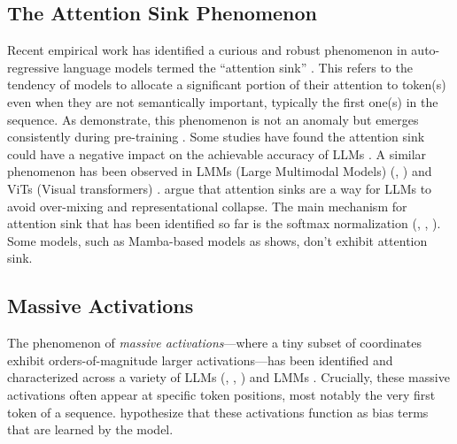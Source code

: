 \documentclass[11pt]{article}
\newif\ifYRMcomments
\newcommand{\YRM}[1]{\ifYRMcomments\textcolor{red}{[YRM: #1]}\fi}
\begin{document}
\subsection{The Attention Sink Phenomenon}
Recent empirical work has identified a curious and robust phenomenon in auto-regressive language models termed the ``attention sink'' \citep{xiao2023efficient}. This refers to the tendency of models to allocate a significant portion of their attention to token(s) even when they are not semantically important, typically the first one(s) in the sequence. As \citet{gu2025when} demonstrate, this phenomenon is not an anomaly but emerges consistently during pre-training \YRM{This is possibly the most important part of the RW. This should be with much more details and more citations, so saying specially that he demonstrated this in model without query bias and absolute positional encoding}. Some studies have found the attention sink could have a negative impact on the achievable accuracy of LLMs \cite{Yu2024Unveiling} \YRM{Can you add a bit of details here? Citing a lot of papers that write about negative impact, even if they only say so in a sentence, would be great}. A similar phenomenon has been observed in LMMs (Large Multimodal Models) (\citet{Kang2025See}, \cite{wang2025mirage}) and ViTs (Visual transformers) \cite{Feng2025EDIT:}. \citet {Barbero2025Why} argue that attention sinks are a
way for LLMs to avoid over-mixing and representational collapse. The main mechanism for attention sink that has been identified so far is the softmax normalization (\citet{xiao2023efficient}, \citet{gu2025when}, \citet{Zuhri2025SoftpickNA}). Some models, such as Mamba-based models as \citet{endy-etal-2025-mamba} shows, don't exhibit attention sink.

\subsection{Massive Activations}
The phenomenon of \emph{massive activations}—where a tiny subset of coordinates exhibit orders-of-magnitude larger activations—has been identified and characterized across a variety of LLMs (\citet{sun2024massive}, \citet{lindnielsen2024spectral}, \citet{lin2024duquant}) and LMMs \cite{Kang2025See}. Crucially, these massive activations often appear at specific token positions, most notably the very first token of a sequence. \citep{sun2024massive} hypothesize that these activations function as bias terms that are learned by the model. 
\end{document}
